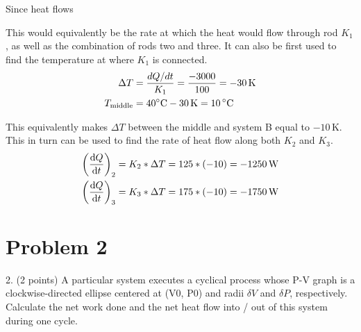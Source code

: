 \documentclass[12pt]{article}
\begin{document}
            Since heat flows 

            This would equivalently be the rate at which the heat would flow through rod $K_1$, as well as the combination of rods two and three.
            It can also be first used to find the temperature at where $K_1$ is connected.
            \begin{align}
                \Delta T    &=  \frac{dQ/dt}{K_1}
                    =   \frac{-3000}{100}
                    =   -30\,\unit{\kelvin}\\
                T_{\rm middle}  &=  40\unit{\celsius} - 30\,\unit{\kelvin}
                    =   10\,\unit{\celsius}
            \end{align}

            This equivalently makes $\Delta T$ between the middle and system B equal to $-10\,\unit{\kelvin}$. 
            This in turn can be used to find the rate of heat flow along both $K_2$ and $K_3$.
            \begin{align}
                \left( \dv{Q}{t} \right)_2  &=  K_2 * \Delta T
                    =   125 * (-10)
                    =   -1250\,\unit{\watt}\\
                \left( \dv{Q}{t} \right)_3  &=  K_3 * \Delta T
                    =   175 * (-10)
                    =   -1750\,\unit{\watt}
            \end{align}
    
    \section{Problem 2}
        2. (2 points) A particular system executes a cyclical process whose P-V graph is a clockwise-directed ellipse centered at (V0, P0) and radii $\delta V$ and $\delta P$, respectively. Calculate the net work
done and the net heat ﬂow into / out of this system during one cycle.
\end{document}

